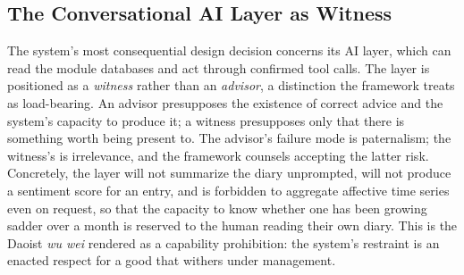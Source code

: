 \documentclass[11pt,a4paper]{article}
\begin{document}
\subsection{The Conversational AI Layer as Witness}\label{p01:sec:witness}

The system's most consequential design decision concerns its AI layer, which can read the module databases and act through confirmed tool calls. The layer is positioned as a \emph{witness} rather than an \emph{advisor}, a distinction the framework treats as load-bearing. An advisor presupposes the existence of correct advice and the system's capacity to produce it; a witness presupposes only that there is something worth being present to. The advisor's failure mode is paternalism; the witness's is irrelevance, and the framework counsels accepting the latter risk. Concretely, the layer will not summarize the diary unprompted, will not produce a sentiment score for an entry, and is forbidden to aggregate affective time series even on request, so that the capacity to know whether one has been growing sadder over a month is reserved to the human reading their own diary. This is the Daoist \emph{wu wei} rendered as a capability prohibition: the system's restraint is an enacted respect for a good that withers under management.
\end{document}

